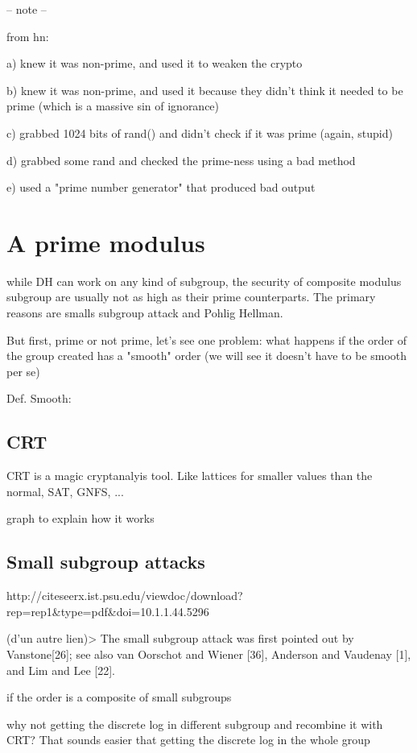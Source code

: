 \documentclass[a4paper,11pt]{article}
\begin{document}
-- note --

from hn:


a) knew it was non-prime, and used it to weaken the crypto

b) knew it was non-prime, and used it because they didn't think it needed to be prime (which is a massive sin of ignorance)

c) grabbed 1024 bits of rand() and didn't check if it was prime (again, stupid)

d) grabbed some rand and checked the prime-ness using a bad method

e) used a "prime number generator" that produced bad output


\section{A prime modulus}

while DH can work on any kind of subgroup, the security of composite modulus subgroup are usually not as high as their prime counterparts. The primary reasons are smalls subgroup attack and Pohlig Hellman.

But first, prime or not prime, let's see one problem: what happens if the order of the group created has a "smooth" order (we will see it doesn't have to be smooth per se)

Def. Smooth:

\subsection{CRT}

CRT is a magic cryptanalyis tool. Like lattices for smaller values than the normal, SAT, GNFS, ...

graph to explain how it works

\subsection{Small subgroup attacks}

http://citeseerx.ist.psu.edu/viewdoc/download?rep=rep1&type=pdf&doi=10.1.1.44.5296

(d'un autre lien)> The small subgroup attack was first pointed out by Vanstone[26]; see also van Oorschot and Wiener [36], Anderson and Vaudenay [1], and Lim and Lee [22].

if the order is a composite of small subgroups

why not getting the discrete log in different subgroup and recombine it with CRT? That sounds easier that getting the discrete log in the whole group
\end{document}
